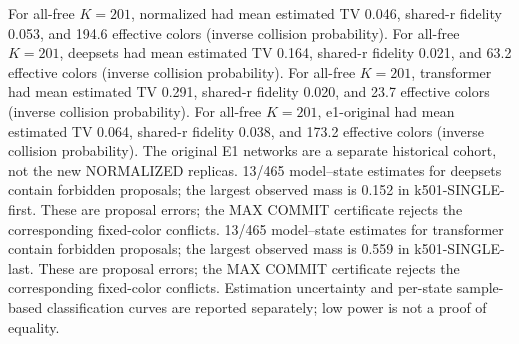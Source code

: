 For all-free $K=201$, normalized had mean estimated TV 0.046, shared-r fidelity 0.053, and 194.6 effective colors (inverse collision probability). For all-free $K=201$, deepsets had mean estimated TV 0.164, shared-r fidelity 0.021, and 63.2 effective colors (inverse collision probability). For all-free $K=201$, transformer had mean estimated TV 0.291, shared-r fidelity 0.020, and 23.7 effective colors (inverse collision probability). For all-free $K=201$, e1-original had mean estimated TV 0.064, shared-r fidelity 0.038, and 173.2 effective colors (inverse collision probability). The original E1 networks are a separate historical cohort, not the new NORMALIZED replicas. 13/465 model--state estimates for deepsets contain forbidden proposals; the largest observed mass is 0.152 in k501-SINGLE-first. These are proposal errors; the MAX COMMIT certificate rejects the corresponding fixed-color conflicts. 13/465 model--state estimates for transformer contain forbidden proposals; the largest observed mass is 0.559 in k501-SINGLE-last. These are proposal errors; the MAX COMMIT certificate rejects the corresponding fixed-color conflicts. Estimation uncertainty and per-state sample-based classification curves are reported separately; low power is not a proof of equality.
